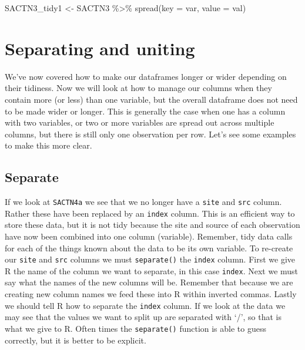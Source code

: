 \documentclass[
]{book}
\newenvironment{Shaded}{\begin{snugshade}}{\end{snugshade}}
\newcommand{\AttributeTok}[1]{\textcolor[rgb]{0.77,0.63,0.00}{#1}}
\newcommand{\FunctionTok}[1]{\textcolor[rgb]{0.00,0.00,0.00}{#1}}
\newcommand{\NormalTok}[1]{#1}
\newcommand{\OtherTok}[1]{\textcolor[rgb]{0.56,0.35,0.01}{#1}}
\newcommand{\SpecialCharTok}[1]{\textcolor[rgb]{0.00,0.00,0.00}{#1}}
\begin{document}
\begin{Shaded}
\begin{Highlighting}[]
\NormalTok{SACTN3\_tidy1 }\OtherTok{\textless{}{-}}\NormalTok{ SACTN3 }\SpecialCharTok{\%\textgreater{}\%} 
  \FunctionTok{spread}\NormalTok{(}\AttributeTok{key =}\NormalTok{ var, }\AttributeTok{value =}\NormalTok{ val)}
\end{Highlighting}
\end{Shaded}

\hypertarget{separating-and-uniting}{%
\section{Separating and uniting}\label{separating-and-uniting}}

We've now covered how to make our dataframes longer or wider depending on their tidiness. Now we will look at how to manage our columns when they contain more (or less) than one variable, but the overall dataframe does not need to be made wider or longer. This is generally the case when one has a column with two variables, or two or more variables are spread out across multiple columns, but there is still only one observation per row. Let's see some examples to make this more clear.

\hypertarget{separate}{%
\subsection{Separate}\label{separate}}

If we look at \texttt{SACTN4a} we see that we no longer have a \texttt{site} and \texttt{src} column. Rather these have been replaced by an \texttt{index} column. This is an efficient way to store these data, but it is not tidy because the site and source of each observation have now been combined into one column (variable). Remember, tidy data calls for each of the things known about the data to be its own variable. To re-create our \texttt{site} and \texttt{src} columns we must \texttt{separate()} the \texttt{index} column. First we give R the name of the column we want to separate, in this case \texttt{index}. Next we must say what the names of the new columns will be. Remember that because we are creating new column names we feed these into R within inverted commas. Lastly we should tell R how to separate the \texttt{index} column. If we look at the data we may see that the values we want to split up are separated with `/', so that is what we give to R. Often times the \texttt{separate()} function is able to guess correctly, but it is better to be explicit.
\end{document}
